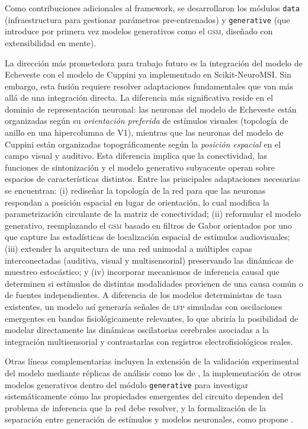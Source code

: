 \documentclass{llncs}
\begin{document}
Como contribuciones adicionales al framework, se desarrollaron los
módulos \texttt{data} (infraestructura para gestionar parámetros
pre-entrenados) y \texttt{generative} (que introduce por primera vez
modelos generativos como el \textsc{gsm}, diseñado con extensibilidad
en mente).

La dirección más prometedora para trabajo futuro es la integración
del modelo de Echeveste con el modelo de Cuppini ya implementado en
Scikit-NeuroMSI. Sin embargo, esta fusión requiere resolver
adaptaciones fundamentales que van más allá de una integración
directa. La diferencia más significativa reside en el dominio de
representación neuronal: las neuronas del modelo de Echeveste están
organizadas según su \emph{orientación preferida} de estímulos
visuales (topología de anillo en una hipercolumna de V1), mientras
que las neuronas del modelo de Cuppini están organizadas
topográficamente según la \emph{posición espacial} en el campo visual
y auditivo. Esta diferencia implica que la conectividad, las
funciones de sintonización y el modelo generativo subyacente operan
sobre espacios de características distintos. Entre las principales
adaptaciones necesarias se encuentran: (i) rediseñar la topología de
la red para que las neuronas respondan a posición espacial en lugar
de orientación, lo cual modifica la parametrización circulante de la
matriz de conectividad; (ii) reformular el modelo generativo,
reemplazando el \textsc{gsm} basado en filtros de Gabor orientados
por uno que capture las estadísticas de localización espacial de
estímulos audiovisuales; (iii) extender la arquitectura de una red
unimodal a múltiples capas interconectadas (auditiva, visual y
multisensorial) preservando las dinámicas de muestreo estocástico;
y (iv) incorporar mecanismos de inferencia causal que determinen si
estímulos de distintas modalidades provienen de una causa común o de
fuentes independientes. A diferencia de los modelos deterministas de
tasa existentes, un modelo así generaría señales de \textsc{lfp}
simuladas con oscilaciones emergentes en bandas fisiológicamente
relevantes, lo que abriría la posibilidad de modelar directamente
las dinámicas oscilatorias cerebrales asociadas a la integración
multisensorial y contrastarlas con registros electrofisiológicos
reales.

Otras líneas complementarias incluyen la extensión de la validación
experimental del modelo mediante réplicas de análisis como los de
\citet{banyai2019stimulus}, la implementación de otros modelos
generativos dentro del módulo \texttt{generative} para investigar
sistemáticamente cómo las propiedades emergentes del circuito
dependen del problema de inferencia que la red debe resolver, y la
formalización de la separación entre generación de estímulos y
modelos neuronales, como propone \citet{paredes2025scikit}.
\end{document}
